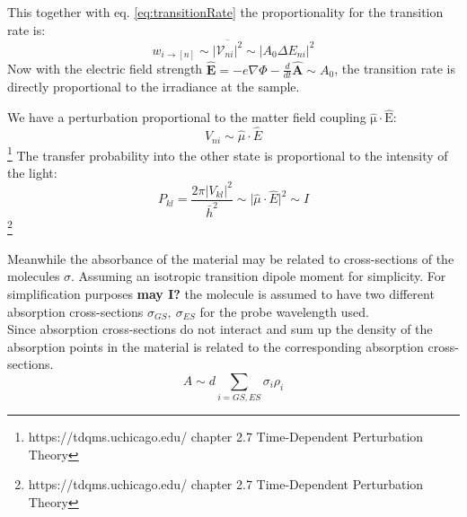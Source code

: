 \documentclass[twoside,openright]{scrreprt}
\begin{document}
This together with eq. \ref{eq:transitionRate} the proportionality for the transition rate is:\cite[chapter 5.7-5.8]{Sakurai_Napolitano_2017}
\begin{equation}
w_{i\rightarrow [n]} \sim \overline{\lvert \mathcal{V}_{ni}\rvert^2} \sim \lvert A_0 \Delta E_{ni}\rvert^2
\end{equation}
Now with the electric field strength $\mathbf{\hat{E}} = -e\nabla\Phi - \frac{d}{dt} \mathbf{\hat{A}}\sim A_0$, the transition rate is directly proportional to the irradiance at the sample.

 
We have a perturbation proportional to the matter field coupling $\mathrm{\hat{\mu}\cdot \hat{E}}$:
\begin{equation}
V_{ni} \sim \hat{\mu}\cdot\hat{E}
\end{equation}\footnote{https://tdqms.uchicago.edu/ chapter 2.7 Time-Dependent Perturbation Theory}
The transfer probability into the other state is proportional to the intensity of the light:
\begin{equation*}
P_{kl} = \frac{2\pi \lvert V_{kl}\rvert^2}{\bar{h}^2} \sim \lvert \hat{\mu}\cdot\hat{E}\rvert^2 \sim I
\end{equation*}\footnote{https://tdqms.uchicago.edu/ chapter 2.7 Time-Dependent Perturbation Theory}

Meanwhile the absorbance of the material may be related to  cross-sections of the molecules $\sigma$. Assuming an isotropic transition dipole moment for simplicity. For simplification purposes \textbf{may I?} the molecule is assumed to have two different absorption cross-sections $\sigma_{GS},\ \sigma_{ES}$ for the probe wavelength used.\\
Since absorption cross-sections do not interact and sum up the density of the absorption points in the material is related to the corresponding absorption cross-sections.
\begin{equation}
A \sim d \sum_{i=GS, ES} \sigma_{i} \rho_i
\end{equation}
\end{document}
